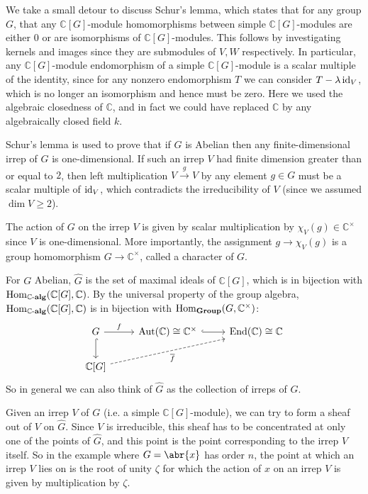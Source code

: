 \documentclass[../../rtnotes.tex]{subfiles}
\begin{document}
We take a small detour to discuss Schur's lemma, which states that for any group $G$, that any $\mathbb C[G]$-module homomorphisms between simple $\mathbb C[G]$-modules are either $0$ or are isomorphisms of $\mathbb C[G]$-modules. This follows by investigating kernels and images since they are submodules of $V,W$ respectively. In particular, any $\mathbb C[G]$-module endomorphism of a simple $\mathbb C[G]$-module is a scalar multiple of the identity, since for any nonzero endomorphism $T$ we can consider $T-\lambda \operatorname{id}_V$, which is no longer an isomorphism and hence must be zero. Here we used the algebraic closedness of $\mathbb C$, and in fact we could have replaced $\mathbb C$ by any algebraically closed field $k$.

Schur's lemma is used to prove that if $G$ is Abelian then any finite-dimensional irrep of $G$ is one-dimensional. If such an irrep $V$ had finite dimension greater than or equal to $2$, then left multiplication $V\xrightarrow{g}V$ by any element $g\in G$ must be a scalar multiple of $\operatorname{id}_V$, which contradicts the irreducibility of $V$ (since we assumed $\dim V\geq 2$). 

The action of $G$ on the irrep $V$ is given by scalar multiplication by $\chi_V(g)\in \mathbb C^\times$ since $V$ is one-dimensional. More importantly, the assignment $g\to\chi_V(g)$ is a group homomorphism $G\to \mathbb C^\times$, called a character of $G$.

For $G$ Abelian, $\widehat G$ is the set of maximal ideals of $\mathbb C[G]$, which is in bijection with $\operatorname{Hom}_{\mathbb C\text{-}{\normalfont\mathbf{alg}}}(\mathbb C[G],\mathbb C)$. By the universal property of the group algebra, $\operatorname{Hom}_{\mathbb C\text{-}{\normalfont\mathbf{alg}}}(\mathbb C[G],\mathbb C)$ is in bijection with $ \operatorname{Hom}_{{\normalfont\mathbf{Group}}}(G,\mathbb C^\times)$:
\[\begin{tikzcd}[ampersand replacement=\&]
	G \& {\Aut(\mathbb C)\cong \mathbb C^\times} \& {\End(\mathbb C)\cong \mathbb C} \\
	{\mathbb C[G]}
	\arrow["f", from=1-1, to=1-2]
	\arrow[hook, from=1-1, to=2-1]
	\arrow[hook, from=1-2, to=1-3]
	\arrow["{\overline f}"', dashed, from=2-1, to=1-3]
\end{tikzcd}\]
So in general we can also think of $\widehat G$ as the collection of irreps of $G$.

Given an irrep $V$ of $G$ (i.e. a simple $\mathbb C[G]$-module), we can try to form a sheaf out of $V$ on $\widehat G$. Since $V$ is irreducible, this sheaf has to be concentrated at only one of the points of $\widehat{G}$, and this point is the point corresponding to the irrep $V$ itself. So in the example where $G = \abr{x}$ has order $n$, the point at which an irrep $V$ lies on is the root of unity $\zeta$ for which the action of $x$ on an irrep $V$ is given by multiplication by $\zeta$.
\end{document}
